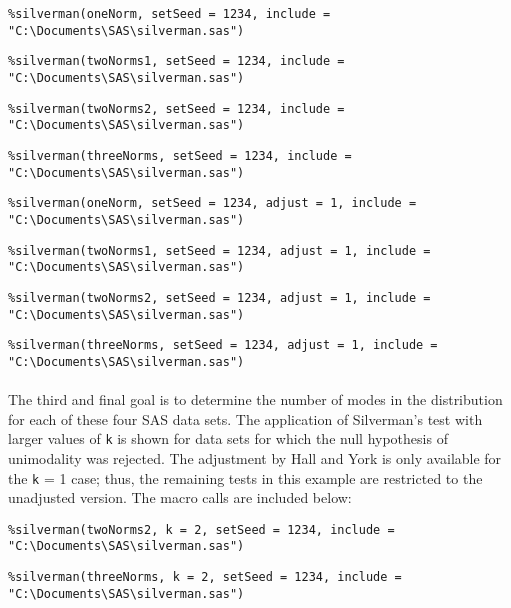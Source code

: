 \documentclass[]{interact}
\theoremstyle{plain}%
\theoremstyle{definition}
\theoremstyle{remark}
\begin{document}
\texttt{\%silverman(oneNorm, setSeed = 1234, include = "C:\textbackslash Documents\textbackslash SAS\textbackslash silverman.sas")}

\texttt{\%silverman(twoNorms1, setSeed = 1234, include = "C:\textbackslash Documents\textbackslash SAS\textbackslash silverman.sas")}

\texttt{\%silverman(twoNorms2, setSeed = 1234, include = "C:\textbackslash Documents\textbackslash SAS\textbackslash silverman.sas")}

\texttt{\%silverman(threeNorms, setSeed = 1234, include = "C:\textbackslash Documents\textbackslash SAS\textbackslash silverman.sas")}

\texttt{\%silverman(oneNorm, setSeed = 1234, adjust = 1, include = "C:\textbackslash Documents\textbackslash SAS\textbackslash silverman.sas")}

\texttt{\%silverman(twoNorms1, setSeed = 1234, adjust = 1, include = "C:\textbackslash Documents\textbackslash SAS\textbackslash silverman.sas")}

\texttt{\%silverman(twoNorms2, setSeed = 1234, adjust = 1, include = "C:\textbackslash Documents\textbackslash SAS\textbackslash silverman.sas")}

\texttt{\%silverman(threeNorms, setSeed = 1234, adjust = 1, include = "C:\textbackslash Documents\textbackslash SAS\textbackslash silverman.sas")}

\paragraph*{}
The third and final goal is to determine the number of modes in the distribution for each of these four SAS data sets. 
The application of Silverman's test with larger values of \texttt{k} is shown for data sets for which the null hypothesis of unimodality was rejected. The adjustment by Hall and York \cite{hall2001calibration} is only available for the \texttt{k} = 1 case; thus, the remaining tests in this example are restricted to the unadjusted version. The macro calls are included below:

\texttt{\%silverman(twoNorms2, k = 2, setSeed = 1234, include = "C:\textbackslash Documents\textbackslash SAS\textbackslash silverman.sas")}

\texttt{\%silverman(threeNorms, k = 2, setSeed = 1234, include = "C:\textbackslash Documents\textbackslash SAS\textbackslash silverman.sas")}

\end{document}

